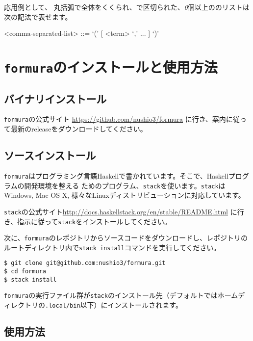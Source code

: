 \documentclass{jsarticle}
\newcommand{\formura}{{\texttt{formura}}}
\def\<#1>{\synt{#1}}
\begin{document}
応用例として、
丸括弧で全体をくくられ、\lit{,}で区切られた、{\em 0}個以上の\<term>のリストは次の記法で表せます。

\begin{grammar}
  <comma-separated-list> ::= `(' [ <term> `,' ...  ] `)'
\end{grammar}

\newpage
\section{\formura のインストールと使用方法}

\subsection{バイナリインストール}

\formura の公式サイト
\href{https://github.com/nushio3/formura}
{https://github.com/nushio3/formura}
に行き、案内に従って最新のreleaseをダウンロードしてください。

\subsection{ソースインストール}

\formura はプログラミング言語Haskellで書かれています。そこで、Haskellプログラムの開発環境を整える
ためのプログラム、\verb`stack`を使います。\verb`stack`はWindows, Mac OS X, 様々なLinuxディストリビューションに対応しています。

\verb`stack`の公式サイト\href{http://docs.haskellstack.org/en/stable/README.html}
    {http://docs.haskellstack.org/en/stable/README.html}
に行き、指示に従って\verb`stack`をインストールしてください。

次に、\formura のレポジトリからソースコードをダウンロードし、レポジトリのルートディレクトリ内で\verb`stack install`コマンドを実行してください。

\begin{verbatim}
$ git clone git@github.com:nushio3/formura.git
$ cd formura
$ stack install
\end{verbatim}

\formura の実行ファイル群が\verb`stack`のインストール先（デフォルトではホームディレクトリの\verb+.local/bin+以下）にインストールされます。


\subsection{使用方法}
\end{document}

